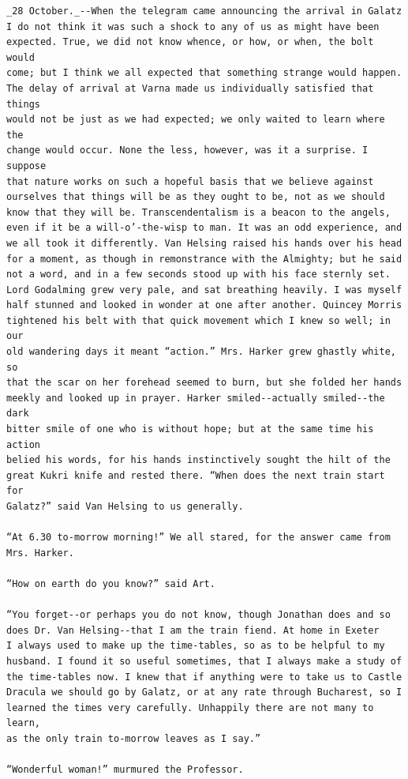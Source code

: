 \documentclass{article}
\begin{document}
\begin{verbatim}
_28 October._--When the telegram came announcing the arrival in Galatz
I do not think it was such a shock to any of us as might have been
expected. True, we did not know whence, or how, or when, the bolt would
come; but I think we all expected that something strange would happen.
The delay of arrival at Varna made us individually satisfied that things
would not be just as we had expected; we only waited to learn where the
change would occur. None the less, however, was it a surprise. I suppose
that nature works on such a hopeful basis that we believe against
ourselves that things will be as they ought to be, not as we should
know that they will be. Transcendentalism is a beacon to the angels,
even if it be a will-o’-the-wisp to man. It was an odd experience, and
we all took it differently. Van Helsing raised his hands over his head
for a moment, as though in remonstrance with the Almighty; but he said
not a word, and in a few seconds stood up with his face sternly set.
Lord Godalming grew very pale, and sat breathing heavily. I was myself
half stunned and looked in wonder at one after another. Quincey Morris
tightened his belt with that quick movement which I knew so well; in our
old wandering days it meant “action.” Mrs. Harker grew ghastly white, so
that the scar on her forehead seemed to burn, but she folded her hands
meekly and looked up in prayer. Harker smiled--actually smiled--the dark
bitter smile of one who is without hope; but at the same time his action
belied his words, for his hands instinctively sought the hilt of the
great Kukri knife and rested there. “When does the next train start for
Galatz?” said Van Helsing to us generally.

“At 6.30 to-morrow morning!” We all stared, for the answer came from
Mrs. Harker.

“How on earth do you know?” said Art.

“You forget--or perhaps you do not know, though Jonathan does and so
does Dr. Van Helsing--that I am the train fiend. At home in Exeter
I always used to make up the time-tables, so as to be helpful to my
husband. I found it so useful sometimes, that I always make a study of
the time-tables now. I knew that if anything were to take us to Castle
Dracula we should go by Galatz, or at any rate through Bucharest, so I
learned the times very carefully. Unhappily there are not many to learn,
as the only train to-morrow leaves as I say.”

“Wonderful woman!” murmured the Professor.


\end{verbatim}
\end{document}
